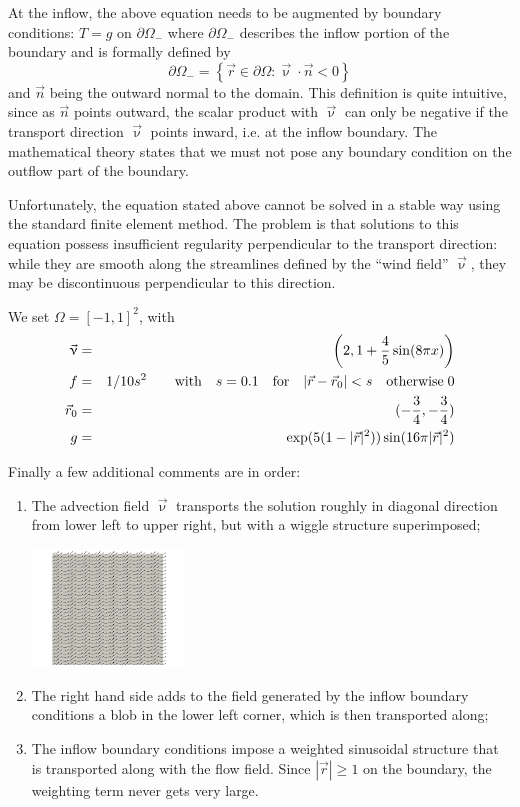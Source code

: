 At the inflow, the above equation needs to be augmented by boundary conditions: 
$T=g$ on $\partial\Omega_-$ where $\partial\Omega_-$ describes the inflow portion 
of the boundary and is formally defined by
\[
\partial\Omega_- = \left\{  \vec{r} \in \partial\Omega : \vec{\upnu}\cdot\vec{n} <0  \right\}
\]
and $\vec{n}$ being the outward normal to the domain. This definition is quite intuitive, 
since as $\vec{n}$ points outward, the scalar product with $\vec{\upnu}$ can only be negative if the transport direction $\vec{\upnu}$ points inward, i.e. at the inflow boundary. The mathematical theory states that we must not pose any boundary condition on the outflow part of the boundary.

Unfortunately, the equation stated above cannot be solved in a stable way using the standard finite element method. The problem is that solutions to this equation possess insufficient regularity perpendicular to the transport direction: while they are smooth along the streamlines defined by the ``wind field'' $\vec{\upnu}$, they may be discontinuous perpendicular to this direction.

We set $\Omega=[-1,1]^2$, with 
\begin{eqnarray}
\vec{\upnu} &=& \left(2, 1+\frac45\sin(8\pi x) \right) \nonumber\\
f&=&1/10s^2 \qquad \text{with} \quad s=0.1 \quad \text{for} \quad |\vec{r}-\vec{r}_0|<s \quad \text{otherwise}\; 0\nonumber\\ 
\vec{r}_0 &=& (-\frac34,-\frac34) \nonumber\\
g&=&\exp(5(1-|\vec{r}|^2))\sin(16\pi |\vec{r}|^2)
\end{eqnarray}

Finally a few additional comments are in order:
\begin{enumerate}
\item The advection field $\vec{\upnu}$ transports the solution roughly in diagonal direction 
from lower left to upper right, but with a wiggle structure superimposed; 
\begin{center}
\includegraphics[width=4cm]{python_codes/fieldstone_43/images/vel}
\end{center}

\item The right hand side adds to the field generated by the inflow boundary conditions a blob 
in the lower left corner, which is then transported along; 
\item The inflow boundary conditions impose a weighted sinusoidal structure that is transported along 
with the flow field. Since $|\vec{r}|\ge 1$ on the boundary, the weighting term never gets very large.
\end{enumerate}

